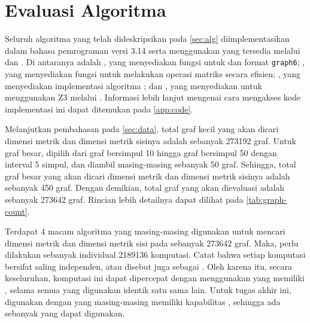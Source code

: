 \section{Evaluasi Algoritma}
\label{sec:implementation}

Seluruh algoritma yang telah dideskripsikan pada \autoref{sec:alg} diimplementasikan dalam bahasa pemrograman  versi 3.14 serta menggunakan  yang tersedia melalui  dan . Di antaranya adalah , yang menyediakan fungsi untuk  dan  format \verb`graph6`; , yang menyediakan fungsi untuk melakukan operasi matriks secara efisien; , yang menyediakan implementasi algoritma ; dan , yang menyediakan  untuk menggunakan  Z3 melalui . Informasi lebih lanjut mengenai cara mengakses kode implementasi ini dapat ditemukan pada \cref{app:code}.

Melanjutkan pembahasan pada \autoref{sec:data}, total graf kecil yang akan dicari dimensi metrik dan dimensi metrik sisinya adalah sebanyak 273192 graf. Untuk graf besar, dipilih dari graf bersimpul 10 hingga graf bersimpul 50 dengan interval 5 simpul, dan diambil masing-masing sebanyak 50 graf. Sehingga, total graf besar yang akan dicari dimensi metrik dan dimensi metrik sisinya adalah sebanyak 450 graf. Dengan demikian, total graf yang akan dievaluasi adalah sebanyak 273642 graf. Rincian lebih detailnya dapat dilihat pada \autoref{tab:graph-count}.

Terdapat 4 macam algoritma yang masing-masing digunakan untuk mencari dimensi metrik dan dimensi metrik sisi pada sebanyak 273642 graf. Maka, perlu dilakukan sebanyak individual 2189136 komputasi. Catat bahwa setiap komputasi bersifat saling independen, atau disebut juga sebagai . Oleh karena itu, secara keseluruhan, komputasi ini dapat dipercepat dengan menggunakan  yang memiliki , selama semua  yang digunakan identik satu sama lain. Untuk tugas akhir ini, digunakan  dengan  yang masing-masing memiliki kapabilitas , sehingga ada sebanyak  yang dapat digunakan.

\vspace{-0.3em}

\begin{center}
	\renewcommand{\minipagewidth}{0.35\linewidth}
	
\end{center}

